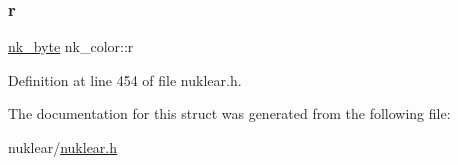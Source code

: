 \subsubsection{\texorpdfstring{r}{r}}
{\footnotesize\ttfamily \mbox{\hyperlink{nuklear_8h_a1a0ad76219a407f92601a49b44507ecb}{nk\+\_\+byte}} nk\+\_\+color\+::r}



Definition at line 454 of file nuklear.\+h.



The documentation for this struct was generated from the following file\+:\begin{DoxyCompactItemize}
\item 
nuklear/\mbox{\hyperlink{nuklear_8h}{nuklear.\+h}}\end{DoxyCompactItemize}
